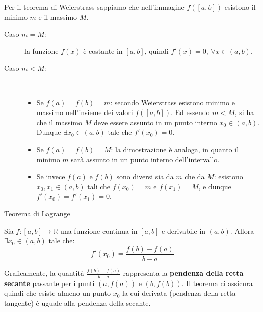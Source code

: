 \documentclass[12pt]{report}
\newcommand{\R}{\mathbb{R}}
\begin{document}
	\begin{dimostrazione}{}{}
		
		Per il teorema di Weierstrass sappiamo che nell'immagine $f([a, b])$ esistono il minimo $m$ e il massimo $M$.
		
		\begin{description}
			
			\item [Caso $m = M$:] la funzione $f(x)$ è costante in $[a, b]$, quindi $f'(x) = 0, \, \forall x \in (a, b)$.
			
			\item [Caso $m < M$:]~
			\begin{itemize}
				
				\item Se $f(a) = f(b) = m$: secondo Weierstrass esistono minimo e massimo nell'insieme dei valori $f([a, b])$. Ed essendo $m < M$, si ha che il massimo $M$ deve essere assunto in un punto interno $x_0 \in (a, b)$. Dunque $\exists x_0 \in (a, b)$ tale che $f'(x_0) = 0$.
				
				\item Se $f(a) = f(b) = M$: la dimostrazione è analoga, in quanto il minimo $m$ sarà assunto in un punto interno dell'intervallo.
				
				\item Se invece $f(a)$ e $f(b)$ sono diversi sia da $m$ che da $M$: esistono $x_0, x_1 \in (a, b)$ tali che $f(x_0) = m$ e $f(x_1) = M$, e dunque $f'(x_0) = f'(x_1) = 0$.
				
			\end{itemize}
			
		\end{description}
		
	\end{dimostrazione}
	
	\begin{teorema}{Teorema di Lagrange}{}
		
		Sia $f: [a, b] \to \R$ una funzione continua in $[a, b]$ e derivabile in $(a, b)$.
		Allora $\exists x_0 \in (a, b)$ tale che:
		\[
		f'(x_0) = \frac{f(b) - f(a)}{b - a}
		\]
		
	\end{teorema}
	
	Graficamente, la quantità $\frac{f(b) - f(a)}{b - a}$ rappresenta la \textbf{pendenza della retta secante} passante per i punti $(a, f(a))$ e $(b, f(b))$. Il teorema ci assicura quindi che esiste almeno un punto $x_0$ la cui derivata (pendenza della retta tangente) è uguale alla pendenza della secante.
	
\end{document}
